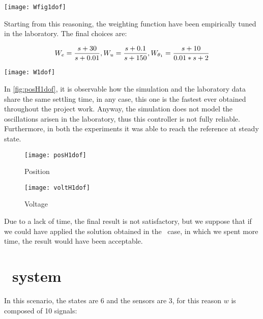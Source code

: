 \begin{figure*}[h]
	\centering
	\texttt{[image: Wfig1dof]}
	\caption{Weighting functions scheme}
	\label{Weighting functions scheme1dof}
\end{figure*}
Starting from this reasoning, the weighting function have been empirically tuned in the laboratory. The final choices are:

\begin{equation}
	W_e=
	\frac{s+30}{s+0.01}
	\\
	,
	\\
	W_u=
	\frac{s+0.1}{s+150}
	\\
	,
	\\
	W_{\theta_{1}}=
	\frac{s+10}{0.01*s+2}
\end{equation}

\begin{figure*}[h]
	\centering
	\texttt{[image: W1dof]}
	\caption{Weighting functions}
\end{figure*}

 In \cref{fig:posH1dof}, it is observable how the simulation and the laboratory data share the same settling time, in any case, this one is the fastest ever obtained throughout the project work. Anyway, the simulation does not model the oscillations arisen in the laboratory, thus this controller is not fully reliable. Furthermore, in both the experiments it was able to reach the reference at steady state.
 
 \begin{figure*}[h]
 	\centering
 	\begin{subfigure}{0.5\columnwidth}
 		\texttt{[image: posH1dof]}
 		\caption{Position}
 	\end{subfigure}
 	\begin{subfigure}{0.45\columnwidth}
 		\texttt{[image: voltH1dof]}
 		\caption{Voltage}
 	\end{subfigure}
 	\caption{Position step response}
 	\label{fig:posH1dof}
 \end{figure*}

Due to a lack of time, the final result is not satisfactory, but we suppose that if we could have applied the solution obtained in the \twodof~case, in which we spent more time, the result would have been acceptable.
\newpage
\section{\twodof\ system}
In this scenario, the states are 6 and the sensors are 3, for this reason $w$ is composed of 10 signals:

